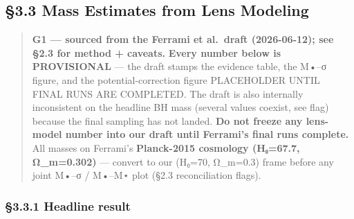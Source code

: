 \documentclass[
]{article}
\newcommand{\BreakablePath}[1]{{\ttfamily\sloppy #1}}
\begin{document}
\hypertarget{mass-estimates-from-lens-modeling}{%
\subsection{§3.3 Mass Estimates from Lens
Modeling}\label{mass-estimates-from-lens-modeling}}

\begin{quote}
\textbf{G1 --- sourced from the Ferrami et al.~draft (2026-06-12); see
§2.3 for method + caveats.} \textbf{Every number below is PROVISIONAL}
--- the draft stamps the evidence table, the M•--σ figure, and the
potential-correction figure
\BreakablePath{PLACEHOLDER UNTIL FINAL RUNS ARE COMPLETED}. The draft is
also internally inconsistent on the headline BH mass (several values
coexist, see flag) because the final sampling has not landed. \textbf{Do
not freeze any lens-model number into our draft until Ferrami's final
runs complete.} All masses on Ferrami's \textbf{Planck-2015 cosmology
(H₀=67.7, Ω\_m=0.302)} --- convert to our (H₀=70, Ω\_m=0.3) frame before
any joint M•--σ / M•--M⋆ plot (§2.3 reconciliation flags).
\end{quote}

\hypertarget{headline-result}{%
\subsubsection{§3.3.1 Headline result}\label{headline-result}}
\end{document}
